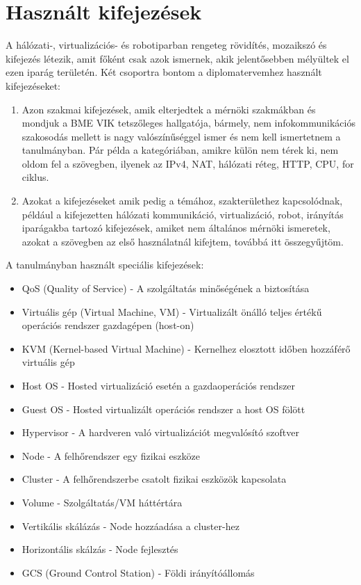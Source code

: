 \section{Használt kifejezések}
A hálózati-, virtualizációs- és robotiparban rengeteg rövidítés, mozaikszó és kifejezés létezik, amit főként csak azok ismernek, akik
jelentősebben mélyültek el ezen iparág területén. Két csoportra bontom a diplomatervemhez használt kifejezéseket:
\begin{enumerate}
	\item Azon szakmai kifejezések, amik elterjedtek a mérnöki szakmákban és mondjuk a BME VIK tetszőleges hallgatója, bármely, nem infokommunikációs szakosodás mellett is nagy valószínűséggel ismer és nem kell ismertetnem a tanulmányban. Pár példa a kategóriában, amikre külön nem térek ki, nem oldom fel a szövegben, ilyenek az IPv4, NAT, hálózati réteg, HTTP, CPU, for ciklus.
	\item Azokat a kifejezéseket amik pedig a témához, szakterülethez kapcsolódnak, például a kifejezetten hálózati kommunikáció, virtualizáció, robot, irányítás iparágakba tartozó kifejezések, amiket nem általános mérnöki ismeretek, azokat a szövegben az első használatnál kifejtem, továbbá itt összegyűjtöm.
\end{enumerate}
A tanulmányban használt speciális kifejezések:
\begin{itemize}
	\item QoS (Quality of Service) - A szolgáltatás minőségének a biztosítása
	\item Virtuális gép (Virtual Machine, VM) - Virtualizált önálló teljes értékű operációs rendszer gazdagépen (host-on)
	\item KVM (Kernel-based Virtual Machine) - Kernelhez elosztott időben hozzáférő virtuális gép
	\item Host OS - Hosted virtualizáció esetén a gazdaoperációs rendszer
	\item Guest OS - Hosted virtualizált operációs rendszer a host OS fölött
	\item Hypervisor - A hardveren való virtualizációt megvalósító szoftver
	\item Node - A felhőrendszer egy fizikai eszköze
	\item Cluster - A felhőrendszerbe csatolt fizikai eszközök kapcsolata
	\item Volume - Szolgáltatás/VM háttértára
	\item Vertikális skálázás - Node hozzáadása a cluster-hez
	\item Horizontális skálzás - Node fejlesztés
	\item GCS (Ground Control Station) - Földi irányítóállomás
\end{itemize}